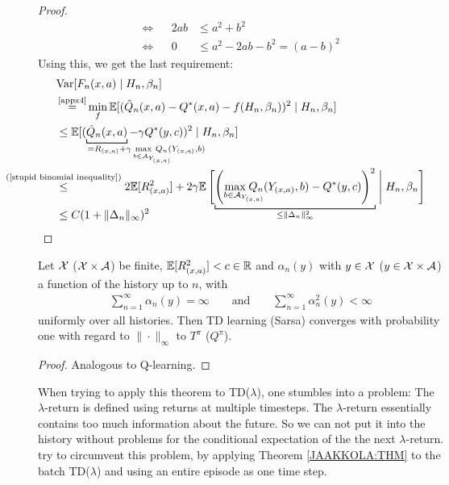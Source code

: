\begin{proof}
\begin{align}
    \iff&& 2ab &\le a^2 + b^2 \nonumber\\
    \iff&& 0 &\le a^2 -2ab -b^2 = (a-b)^2 \nonumber
\end{align}
Using this, we get the last requirement:
\begin{align*}
    &\text{Var}[F_n(x,a)\mid H_n,\beta_n]\\
    &\xeq{\text{\ref{appx4}}}\min_{f} \E[(\hat{Q}_n(x,a)-Q^*(x,a) -f(H_n,\beta_n))^2\mid H_n, \beta_n ]\\
    &\le \E[(\underbracket[0.7pt]{\hat{Q}_n(x,a)}_{
        =R_{(x,a)} + \mathrlap{\gamma \max\limits_{b\in\cA_{Y_{\mathrlap{(x,a)}}}}Q_n(Y_{(x,a)}, b)}
    }-\gamma Q^*(y,c))^2\mid H_n, \beta_n ]\\
    &\lxlq{\text{(\ref{stupid binomial inequality})}} 2\E[ R_{(x,a)}^2] 
    + 2\gamma \E\left[\vphantom{
        \left(
            \max\limits_{b\in\cA_{Y_{\mathrlap{(x,a)}}}}
            Q_n(Y_{(x,a)}, b)-Q^*(y,c)
        \right)
    }
        \smash{\underbracket[0.7pt]{
        \left(
            \max\limits_{b\in\cA_{Y_{\mathrlap{(x,a)}}}}
            Q_n(Y_{(x,a)}, b)-Q^*(y,c)
        \right)^2 
        }_{
        \le \|\Delta_n\|_\infty^2
    }}\;\middle|\; H_n,\beta_n \right] \\
    &\le C(1+\|\Delta_n\|_\infty)^2\qedhere
\end{align*}
\end{proof}

\begin{corollary}[TD(\(0\))]
    Let \(\mathcal{X}\) (\(\mathcal{X}\times\mathcal{A}\)) be finite, \(\mathbb{E}[R_{(x,a)}^2]<c\in\mathbb{R}\) and \(\alpha_n(y)\) with \(y\in\mathcal{X}\) (\(y\in\mathcal{X}\times\mathcal{A}\)) a function of the history up to \(n\), with
    \begin{align}\label{learning rate:TD learning}
        \sum_{n=1}^\infty \alpha_n(y)=\infty \qquad \text{and}\qquad \sum_{n=1}^\infty \alpha_n^2(y)<\infty
    \end{align}
    uniformly over all histories.
    Then TD learning (Sarsa) converges with probability one with regard to \(\|\cdot\|_\infty\) to \(T^\pi\) (\(Q^\pi\)). 
\end{corollary}
\begin{proof}
    Analogous to Q-learning.
\end{proof}

When trying to apply this theorem to TD(\(\lambda\)), one stumbles into a problem: The \(\lambda\)-return is defined using returns at multiple timesteps. The \(\lambda\)-return essentially contains too much information about the future. So we can not put it into the history without problems for the conditional expectation of the the next \(\lambda\)-return. \textcite{jaakkolaConvergenceStochasticIterative1994a} try to circumvent this problem, by applying Theorem \ref{JAAKKOLA:THM} to the batch TD(\(\lambda\)) and using an entire episode as one time step. 

